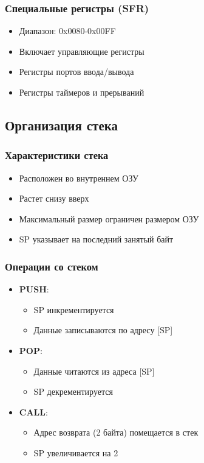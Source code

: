 \documentclass[a4paper, 12pt]{article}
\begin{document}
\subsubsection{Специальные регистры (SFR)}
\begin{itemize}
    \item Диапазон: 0x0080-0x00FF
    \item Включает управляющие регистры
    \item Регистры портов ввода/вывода
    \item Регистры таймеров и прерываний
\end{itemize}

\subsection{Организация стека}
\subsubsection{Характеристики стека}
\begin{itemize}
    \item Расположен во внутреннем ОЗУ
    \item Растет снизу вверх
    \item Максимальный размер ограничен размером ОЗУ
    \item SP указывает на последний занятый байт
\end{itemize}

\subsubsection{Операции со стеком}
\begin{itemize}
    \item \textbf{PUSH}:
    \begin{itemize}
        \item SP инкрементируется
        \item Данные записываются по адресу [SP]
    \end{itemize}
    \item \textbf{POP}:
    \begin{itemize}
        \item Данные читаются из адреса [SP]
        \item SP декрементируется
    \end{itemize}
    \item \textbf{CALL}:
    \begin{itemize}
        \item Адрес возврата (2 байта) помещается в стек
        \item SP увеличивается на 2
    \end{itemize}
\end{itemize}
\end{document}
